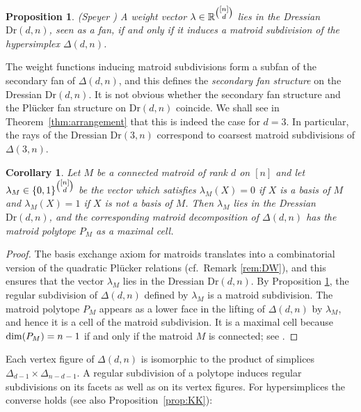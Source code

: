\documentclass[12pt,a4paper]{amsart}
\newtheorem{cor}[thm]{Corollary}
\newtheorem{prop}[thm]{Proposition}
\theoremstyle{definition}
\newcommand{\R}{{\mathbb{R}}}
\newcommand{\Dr}{{\mathrm{Dr}}}
\providecommand{\MatroidPolytope}[1]{P_{#1}}
\begin{document}
\begin{prop}{\rm (Speyer \cite[Proposition~2.2]{Spe1})}
  \label{prop:Speyer} A weight vector $\lambda \in
  \R^{\tbinom{[n]}{d}}$ lies in the Dressian $\Dr(d,n)$, seen as a
  fan, if and only if it induces a matroid subdivision of the
  hypersimplex $\Delta(d,n)$.
\end{prop}

The weight functions inducing matroid subdivisions form a
subfan of the secondary fan of $\Delta(d,n)$, and this defines the
\emph{secondary fan structure} on the Dressian $\Dr(d,n)$.  It is not
obvious whether the secondary fan structure and the Pl\"ucker fan
structure on $\Dr(d,n)$ coincide. We shall see in
Theorem~\ref{thm:arrangement} that this is indeed the case
for $d=3$.  In particular, the rays of the Dressian
$\Dr(3,n)$ correspond to coarsest matroid
subdivisions of $\Delta(3,n)$.


\begin{cor}\label{cor:matroid}
  Let $M$ be a connected matroid of rank $d$ on $[n]$ and let
  $\lambda_M \in \{0,1\}^{\tbinom{[n]}{d}}$ be the vector which
  satisfies $\lambda_M(X) = 0$ if $X$ is a basis of $M$ and
  $\lambda_M(X) = 1$ if $X$ is not a basis of $M$.  Then $\lambda_M$
  lies in the Dressian $\Dr(d,n)$, and the corresponding matroid
  decomposition of $\Delta(d,n)$ has the matroid polytope
  $\MatroidPolytope{M}$ as a maximal cell.
\end{cor}

\begin{proof}
  The basis exchange axiom for matroids translates into a
  combinatorial version of the quadratic Pl\"ucker relations
  (cf.~Remark \ref{rem:DW}), and this ensures that the vector
  $\lambda_M$ lies in the Dressian $\Dr(d,n)$.  By Proposition
  \ref{prop:Speyer}, the regular subdivision of $\Delta(d,n)$ defined
  by $\lambda_M$ is a matroid subdivision.  The matroid polytope
  $\MatroidPolytope{M}$ appears as a lower face in the lifting of
  $\Delta(d,n)$ by $\lambda_M$, and hence it is a cell of the matroid
  subdivision.  It is a maximal cell because ${\rm
    dim}(\MatroidPolytope{M}) = n-1$ if and only if the matroid $M$ is
  connected; see \cite{FS}.
\end{proof}

Each vertex figure of $\Delta(d,n)$ is isomorphic to the product of
simplices $\Delta_{d-1}\times\Delta_{n-d-1}$.  A regular subdivision
of a polytope induces regular subdivisions on its facets as well as on
its vertex figures.  For hypersimplices the converse holds
(see also Proposition~\ref{prop:KK}):
\end{document}
